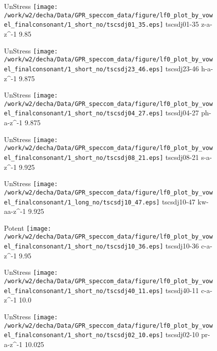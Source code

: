 \documentclass{article}
\begin{document}
\begin{figure}[t]
\begin{minipage}[b]{.24\textwidth}
UnStress
\centering
\texttt{[image: /work/w2/decha/Data/GPR\_speccom\_data/figure/lf0\_plot\_by\_vowel\_finalconsonant/1\_short\_no/tscsdj01\_35.eps]}
tscsdj01-35 z-a-z\textasciicircum-1 9.85
\end{minipage}
\begin{minipage}[b]{.24\textwidth}
UnStress
\centering
\texttt{[image: /work/w2/decha/Data/GPR\_speccom\_data/figure/lf0\_plot\_by\_vowel\_finalconsonant/1\_short\_no/tscsdj23\_46.eps]}
tscsdj23-46 h-a-z\textasciicircum-1 9.875
\end{minipage}
\begin{minipage}[b]{.24\textwidth}
UnStress
\centering
\texttt{[image: /work/w2/decha/Data/GPR\_speccom\_data/figure/lf0\_plot\_by\_vowel\_finalconsonant/1\_short\_no/tscsdj04\_27.eps]}
tscsdj04-27 ph-a-z\textasciicircum-1 9.875
\end{minipage}
\begin{minipage}[b]{.24\textwidth}
UnStress
\centering
\texttt{[image: /work/w2/decha/Data/GPR\_speccom\_data/figure/lf0\_plot\_by\_vowel\_finalconsonant/1\_short\_no/tscsdj08\_21.eps]}
tscsdj08-21 s-a-z\textasciicircum-1 9.925
\end{minipage}
\end{figure}

\begin{figure}[t]
\begin{minipage}[b]{.24\textwidth}
UnStress
\centering
\texttt{[image: /work/w2/decha/Data/GPR\_speccom\_data/figure/lf0\_plot\_by\_vowel\_finalconsonant/1\_long\_no/tscsdj10\_47.eps]}
tscsdj10-47 kw-aa-z\textasciicircum-1 9.925
\end{minipage}
\begin{minipage}[b]{.24\textwidth}
\colorbox{Apricot}{Potent}
\centering
\texttt{[image: /work/w2/decha/Data/GPR\_speccom\_data/figure/lf0\_plot\_by\_vowel\_finalconsonant/1\_short\_no/tscsdj10\_36.eps]}
tscsdj10-36 c-a-z\textasciicircum-1 9.95
\end{minipage}
\begin{minipage}[b]{.24\textwidth}
UnStress
\centering
\texttt{[image: /work/w2/decha/Data/GPR\_speccom\_data/figure/lf0\_plot\_by\_vowel\_finalconsonant/1\_short\_no/tscsdj40\_11.eps]}
tscsdj40-11 c-a-z\textasciicircum-1 10.0
\end{minipage}
\begin{minipage}[b]{.24\textwidth}
UnStress
\centering
\texttt{[image: /work/w2/decha/Data/GPR\_speccom\_data/figure/lf0\_plot\_by\_vowel\_finalconsonant/1\_short\_no/tscsdj02\_10.eps]}
tscsdj02-10 pr-a-z\textasciicircum-1 10.025
\end{minipage}
\end{figure}
\end{document}
